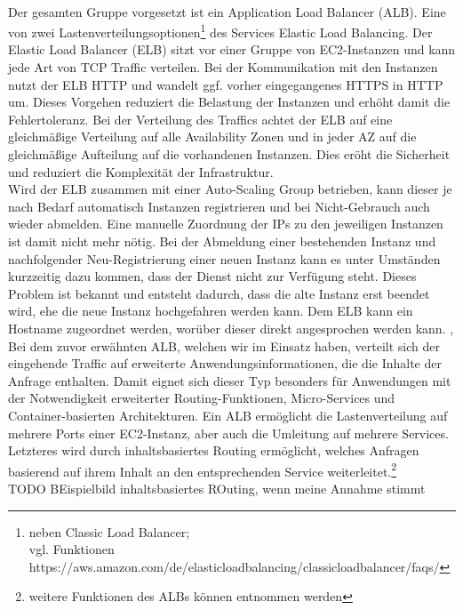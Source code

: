 \\
Der gesamten Gruppe vorgesetzt ist ein Application Load Balancer (ALB). Eine von zwei Lastenverteilungsoptionen\footnote{neben Classic Load Balancer; \\vgl. Funktionen https://aws.amazon.com/de/elasticloadbalancing/classicloadbalancer/faqs/} des Services Elastic Load Balancing.
Der Elastic Load Balancer (ELB) sitzt vor einer Gruppe von EC2-Instanzen und kann jede Art von TCP Traffic verteilen. Bei der Kommunikation mit den Instanzen nutzt der ELB HTTP und wandelt ggf. vorher eingegangenes HTTPS in HTTP um. Dieses Vorgehen reduziert die Belastung der Instanzen und erhöht damit die Fehlertoleranz. Bei der Verteilung des Traffics achtet der ELB auf eine gleichmäßige Verteilung auf alle Availability Zonen und in jeder AZ auf die gleichmäßige Aufteilung auf die vorhandenen Instanzen. Dies eröht die Sicherheit und reduziert die Komplexität der Infrastruktur.
\\ Wird der ELB zusammen mit einer Auto-Scaling Group betrieben, kann dieser je nach Bedarf automatisch Instanzen registrieren und bei Nicht-Gebrauch auch wieder abmelden. Eine manuelle Zuordnung der IPs zu den jeweiligen Instanzen ist damit nicht mehr nötig. Bei der Abmeldung einer bestehenden Instanz und nachfolgender Neu-Registrierung einer neuen Instanz kann es unter Umständen kurzzeitig dazu kommen, dass der Dienst nicht zur Verfügung steht. Dieses Problem ist bekannt und entsteht dadurch, dass die alte Instanz erst beendet wird, ehe die neue Instanz hochgefahren werden kann.
Dem ELB kann ein Hostname zugeordnet werden, worüber dieser direkt angesprochen werden kann.
\cite{vliet:resilience}, \cite{aws:elb} \\

Bei dem zuvor erwähnten ALB, welchen wir im Einsatz haben, verteilt sich der eingehende Traffic auf erweiterte Anwendungsinformationen, die die Inhalte der Anfrage enthalten. Damit eignet sich dieser Typ besonders für Anwendungen mit der Notwendigkeit erweiterter Routing-Funktionen, Micro-Services und Container-basierten Architekturen. Ein ALB ermöglicht die Lastenverteilung auf mehrere Ports einer EC2-Instanz, aber auch die Umleitung auf mehrere Services. Letzteres wird durch inhaltsbasiertes Routing ermöglicht, welches Anfragen basierend auf ihrem Inhalt an den entsprechenden Service weiterleitet.\footnote{weitere Funktionen des ALBs können \cite{aws:alb} entnommen werden}\\

TODO BEispielbild inhaltsbasiertes ROuting, wenn meine Annahme stimmt

